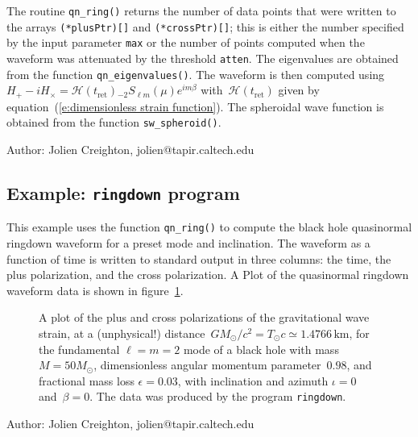 The routine \texttt{qn\_ring()} returns the number of data points that were
written to the arrays \texttt{(*plusPtr)[]} and \texttt{(*crossPtr)[]}; this
is either the number specified by the input parameter \texttt{max} or the
number of points computed when the waveform was attenuated by the threshold
\texttt{atten}.  The eigenvalues are obtained from the function
\texttt{qn\_eigenvalues()}.  The waveform is
then computed using $H_+-iH_\times={\mathcal{H}}(t_{\mathrm{\scriptstyle ret}})
 {}_{-2}S_{\ell m}(\mu)e^{im\beta}$
with~${\mathcal{H}}(t_{\mathrm{\scriptstyle ret}})$ given by
equation~(\ref{e:dimensionless strain function}).  The spheroidal wave function
is obtained from the function \texttt{sw\_spheroid()}.

\begin{description}
\item{Author:} Jolien Creighton, jolien@tapir.caltech.edu
\end{description}


\clearpage
\subsection{Example: \texttt{ringdown} program}

This example uses the function \texttt{qn\_ring()} to compute the black hole
quasinormal ringdown waveform for a preset mode and inclination.  The waveform
as a function of time is written to standard output in three columns: the time,
the plus polarization, and the cross polarization.  A Plot of the quasinormal
ringdown waveform data is shown in figure~\ref{f:ring}.

\begin{figure}[h]
\begin{center}
\caption{\label{f:ring} A plot of the plus and cross polarizations of the
  gravitational wave strain, at a (unphysical!)
  distance~$GM_\odot/c^2=T_\odot c\simeq1.4766\,{\mathrm{km}}$,
  for the fundamental
  $\ell=m=2$ mode of a black hole with mass $M=50M_\odot$, dimensionless
  angular momentum parameter~$0.98$, and fractional mass loss $\epsilon=0.03$,
  with inclination and azimuth $\iota=0$ and~$\beta=0$.  The data was produced
  by the program \texttt{ringdown}.}
\end{center}
\end{figure}

\clearpage
{}

\begin{description}
\item{Author:} Jolien Creighton, jolien@tapir.caltech.edu
\end{description}



